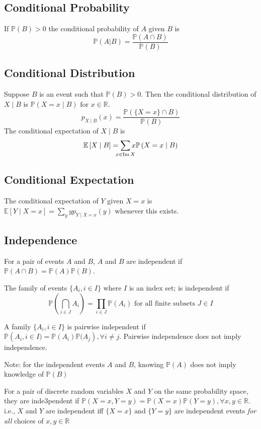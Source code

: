 \documentclass[fontsize=10pt]{article}
\numberwithin{equation}{subsection}
\newcommand{\PP}[1]{\mathbb{P}\left(#1\right)}
\newcommand{\EE}[1]{\mathbb{E}\left[#1\right]}
\newcommand{\image}{\mathop{\mathrm{Im}}}
\newcommand{\setreal}{\mathbb{R}}
\begin{document}
\begin{multicols}{2}
\subsection{Conditional Probability}
If $\PP{B}>0$ the conditional probability of $A$ given $B$ is \[\PP{A|B}=\frac{\PP{A\cap B}}{\PP{B}}\]
\subsection{Conditional Distribution}
Suppose $B$ is an event such that $\PP B>0$.  Then the conditional distribution of $X\mid B$ is $\PP{X=x\mid B}\text{ for }x\in\setreal$.  \[p_{X\mid B}(x)=\frac{\PP{\{X=x\}\cap B}}{\PP B}\]The conditional expectation of $X\mid B$ is \[\EE{X\mid B}=\sum_{\mathclap{x\in\image X}}x\PP{X=x\mid B}\]
\subsection{Conditional Expectation}
The conditional expectation of $Y$ given $X=x$ is $\EE{Y\mid X=x}=\sum_yyp_{Y\mid X=x}(y)$ whenever this exists.
\subsection{Independence}
For a pair of events $A$ and $B$, $A$ and $B$ are independent if $\PP{A\cap B}=\PP{A}\PP{B}$.

The family of events $\{A_i,i\in I\}$ where $I$ is an index set; is independent if\[\PP{\bigcap_{i\in J} A_i}=\prod_{i\in J} \PP{A_i}\text{ for all finite subsets } J\in I\]

A family $\{A_i, i\in I\}$ is pairwise independent if $\PP{A_i, i \in I)=\mathbb{P}(A_i)\mathbb{P}(A_j},\forall i\neq j$.  Pairwise independence does not imply independence.

{\small Note: for the independent events $A$ and $B$, knowing $\PP{A}$ does not imply knowledge of $\PP{B}$}

For a pair of discrete random variables $X$ and $Y$ on the same probability space, they are inde3pendent if $\PP{X=x,Y=y}=\PP{X=x}\PP{Y=y},\forall x,y\in\setreal$. i.e., $X$ and $Y$ are independent iff $\{X=x\}\text{ and }\{Y=y\}$ are independent events \emph{for all} choices of $x,y\in\setreal$

\end{multicols}
\end{document}
